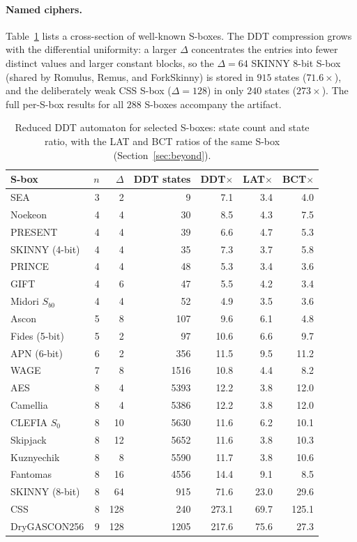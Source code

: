 \documentclass[runningheads]{llncs}
\begin{document}
\paragraph{Named ciphers.}
Table~\ref{tab:curated} lists a cross-section of well-known S-boxes. The DDT
compression grows with the differential uniformity: a larger $\Delta$ concentrates
the entries into fewer distinct values and larger constant blocks, so the
$\Delta=64$ SKINNY $8$-bit S-box~\cite{skinny} (shared by Romulus, Remus, and ForkSkinny) is
stored in $915$ states ($71.6\times$), and the deliberately weak CSS S-box
($\Delta=128$) in only $240$ states ($273\times$). The full per-S-box results
for all $288$ S-boxes accompany the artifact.

\begin{table}[t]
\centering
\caption{Reduced DDT automaton for selected S-boxes: state count and state ratio,
with the LAT and BCT ratios of the same S-box (Section~\ref{sec:beyond}).}
\label{tab:curated}
\small
\begin{tabular}{l r r r r r r}
\toprule
S-box & $n$ & $\Delta$ & DDT states & DDT$\times$ & LAT$\times$ & BCT$\times$\\
\midrule
SEA            & 3 & 2   & 9    & 7.1  & 3.4  & 4.0\\
Noekeon        & 4 & 4   & 30   & 8.5  & 4.3  & 7.5\\
PRESENT        & 4 & 4   & 39   & 6.6  & 4.7  & 5.3\\
SKINNY (4-bit) & 4 & 4   & 35   & 7.3  & 3.7  & 5.8\\
PRINCE         & 4 & 4   & 48   & 5.3  & 3.4  & 3.6\\
GIFT           & 4 & 6   & 47   & 5.5  & 4.2  & 3.4\\
Midori $S_{b0}$& 4 & 4   & 52   & 4.9  & 3.5  & 3.6\\
Ascon          & 5 & 8   & 107  & 9.6  & 6.1  & 4.8\\
Fides (5-bit)  & 5 & 2   & 97   & 10.6 & 6.6  & 9.7\\
APN (6-bit)    & 6 & 2   & 356  & 11.5 & 9.5  & 11.2\\
WAGE           & 7 & 8   & 1516 & 10.8 & 4.4  & 8.2\\
AES            & 8 & 4   & 5393 & 12.2 & 3.8  & 12.0\\
Camellia       & 8 & 4   & 5386 & 12.2 & 3.8  & 12.0\\
CLEFIA $S_0$   & 8 & 10  & 5630 & 11.6 & 6.2  & 10.1\\
Skipjack       & 8 & 12  & 5652 & 11.6 & 3.8  & 10.3\\
Kuznyechik     & 8 & 8   & 5590 & 11.7 & 3.8  & 10.6\\
Fantomas       & 8 & 16  & 4556 & 14.4 & 9.1  & 8.5\\
SKINNY (8-bit) & 8 & 64  & 915  & 71.6 & 23.0 & 29.6\\
CSS            & 8 & 128 & 240  & 273.1& 69.7 & 125.1\\
DryGASCON256   & 9 & 128 & 1205 & 217.6& 75.6 & 27.3\\
\bottomrule
\end{tabular}
\end{table}
\end{document}
